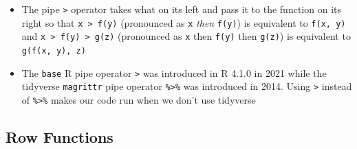 \documentclass[
  letterpaper,
  DIV=11,
  numbers=noendperiod]{scrreprt}
\providecommand{\tightlist}{%
  \setlength{\itemsep}{0pt}\setlength{\parskip}{0pt}}\usepackage{longtable,booktabs,array}
\begin{document}
\begin{itemize}
\tightlist
\item
  The pipe \texttt{\textbar{}\textgreater{}} operator takes what on its
  left and pass it to the function on its right so that
  \texttt{x\ \textbar{}\textgreater{}\ f(y)} (pronounced as \texttt{x}
  \emph{then} \texttt{f(y)}) is equivalent to \texttt{f(x,\ y)} and
  \texttt{x\ \textbar{}\textgreater{}\ f(y)\ \textbar{}\textgreater{}\ g(z)}
  (pronounced as \texttt{x} then \texttt{f(y)} then \texttt{g(z)}) is
  equivalent to \texttt{g(f(x,\ y),\ z)}
\item
  The \texttt{base} R pipe operator \texttt{\textbar{}\textgreater{}}
  was introduced in R 4.1.0 in 2021 while the tidyverse
  \texttt{magrittr} pipe operator \texttt{\%\textgreater{}\%} was
  introduced in 2014. Using \texttt{\textbar{}\textgreater{}} instead of
  \texttt{\%\textgreater{}\%} makes our code run when we don't use
  tidyverse
\end{itemize}

\subsection{Row Functions}\label{row-functions}
\end{document}
